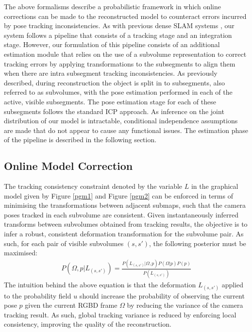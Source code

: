 The above formalisms describe a probabilistic framework in which online corrections can be made to the reconstructed model to counteract 
errors incurred by pose tracking inconsistencies. As with previous dense SLAM systems \cite{Newcombe2011, Prisacariu2014, Niessner2013}, 
our system follows a pipeline that consists of a tracking stage and an integration stage. However, our formulation of this pipeline 
consists of an additional estimation module that relies on the use of a subvolume representation to correct tracking errors by applying 
transformations to the subsegments to align them when there are intra subsegment tracking inconsistencies. 
As previously described, during reconstruction the object is split in to subsegments, also referred to as subvolumes, 
with the pose estimation performed in each of the active, visible subsegments. The pose estimation stage for each of these subsegments follows 
the standard ICP approach.
As inference on the joint distribution of our model is intractable, conditional independence assumptions are made that do not appear 
to cause any functional issues. The estimation phase of the pipeline is described in the following section.

\subsection{Online Model Correction}
\label{subsec:onlinemodelcorrection}

The tracking consistency constraint denoted by the variable $L$ in the graphical model given by Figure \ref{pgm1} and Figure \ref{pgm2} can 
be enforced in terms of minimising the transformations between adjacent submaps, such that the camera poses tracked in each subvolume are consistent.  
Given instantaneously inferred transforms between subvolumes obtained from tracking results, 
the objective is to infer a robust, consistent deformation transformation for the subvolume pair.
As such, for each pair of visible subvolumes $(s, s')$, the following posterior must be maximised:
\begin{equation}
\begin{split}
P(\Omega, p | L_{(s, s')}) = \frac{P(L_{(s, s')} | \Omega, p) P(\Omega | p)P(p)}
{P(L_{(s, s')})}
\end{split}
\end{equation}
The intuition behind the above equation is that the deformation $L_{(s, s')}$ applied to the probability field $u$ should 
increase the probability of observing the current pose $p$ given the current RGBD frame $\Omega$ by reducing the 
variance of the camera tracking result. As such, global tracking variance is reduced by enforcing local consistency, improving the quality 
of the reconstruction.

